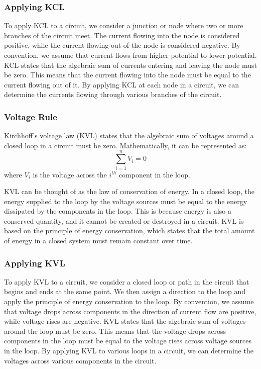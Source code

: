 \documentclass[12pt]{article}
\begin{document}
\subsubsection{Applying KCL}
To apply KCL to a circuit, we consider a junction or node where two or more branches of the circuit meet. The current flowing into the node is considered positive, while the current flowing out of the node is considered negative. By convention, we assume that current flows from higher potential to lower potential. KCL states that the algebraic sum of currents entering and leaving the node must be zero. This means that the current flowing into the node must be equal to the current flowing out of it. By applying KCL at each node in a circuit, we can determine the currents flowing through various branches of the circuit.
  \subsubsection{Voltage Rule}
  \begin{idea}
      Kirchhoff's voltage law (KVL) states that the algebraic sum of voltages around a closed loop in a circuit must be zero. Mathematically, it can be represented as:
      \[\sum_{i=1}^n V_i = 0\]
      where $V_i$ is the voltage across the $i^{th}$ component in the loop. 
  \end{idea}
  KVL can be thought of as the law of conservation of energy. In a closed loop, the energy supplied to the loop by the voltage sources must be equal to the energy dissipated by the components in the loop. This is because energy is also a conserved quantity, and it cannot be created or destroyed in a circuit. KVL is based on the principle of energy conservation, which states that the total amount of energy in a closed system must remain constant over time.
\subsubsection{Applying KVL}
To apply KVL to a circuit, we consider a closed loop or path in the circuit that begins and ends at the same point. We then assign a direction to the loop and apply the principle of energy conservation to the loop. By convention, we assume that voltage drops across components in the direction of current flow are positive, while voltage rises are negative. KVL states that the algebraic sum of voltages around the loop must be zero. This means that the voltage drops across components in the loop must be equal to the voltage rises across voltage sources in the loop. By applying KVL to various loops in a circuit, we can determine the voltages across various components in the circuit.
\end{document}
